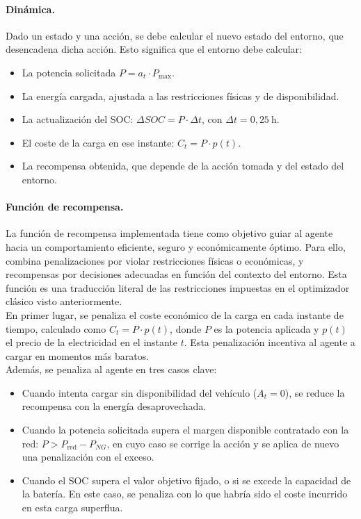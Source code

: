 \paragraph{Dinámica.} 
Dado un estado y una acción, se debe calcular el nuevo estado del entorno, que desencadena dicha 
acción. Esto significa que el entorno debe calcular:
\begin{itemize}
    \item La potencia solicitada \(P = a_t \cdot P_{\text{max}}\).
    \item La energía cargada, ajustada a las restricciones físicas y de disponibilidad.
    \item La actualización del SOC: \(\Delta SOC = P \cdot \Delta t\), con 
    \(\Delta t = 0{,}25~\text{h}\).
    \item El coste de la carga en ese instante: \(C_t = P \cdot p(t)\).
    \item La recompensa obtenida, que depende de la acción tomada y del estado del entorno.
\end{itemize}

\paragraph{Función de recompensa.} 
La función de recompensa implementada tiene como objetivo guiar al agente hacia un comportamiento 
eficiente, seguro y económicamente óptimo. Para ello, combina penalizaciones por violar 
restricciones físicas o económicas, y recompensas por decisiones adecuadas en función del contexto 
del entorno. Esta función es una traducción literal de las restricciones impuestas en el 
optimizador clásico visto anteriormente.\\

En primer lugar, se penaliza el coste económico de la carga en cada instante de tiempo, calculado 
como \( C_t = P \cdot p(t) \), donde \(P\) es la potencia aplicada y \(p(t)\) el precio de la 
electricidad en el instante \(t\). Esta penalización incentiva al agente a cargar en momentos más 
baratos.\\

Además, se penaliza al agente en tres casos clave:
\begin{itemize}
    \item Cuando intenta cargar sin disponibilidad del vehículo (\(A_t = 0\)), se reduce la 
    recompensa con la energía desaprovechada.
    \item Cuando la potencia solicitada supera el margen disponible contratado con la red: \( P > P_{\text{red}} - P_{NG} \), 
    en cuyo caso se corrige la acción y se aplica de nuevo una penalización con el exceso.
    \item Cuando el SOC supera el valor objetivo fijado, o si se excede la capacidad de la batería.
    En este caso, se penaliza con lo que habría sido el coste incurrido en esta carga superflua.
\end{itemize}

